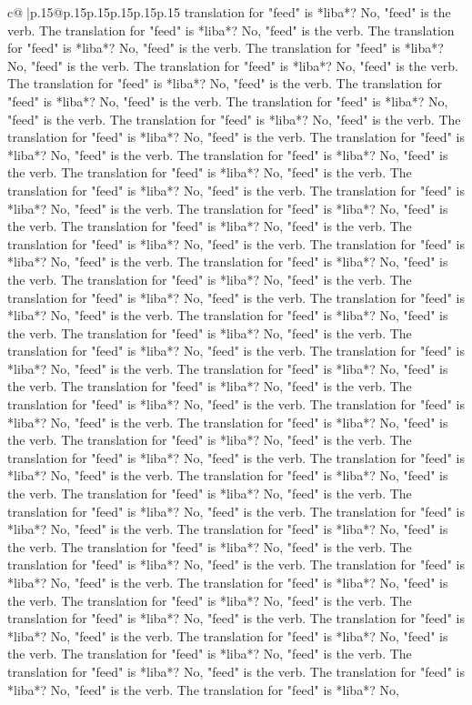 \documentclass{article}
\begin{document}
{\begin{supertabular}{c@{$\;$}|p{.15\linewidth}@{}p{.15\linewidth}p{.15\linewidth}p{.15\linewidth}p{.15\linewidth}p{.15\linewidth}}
{{{translation for "feed" is *liba*? No, "feed" is the verb. The translation for "feed" is *liba*? No, "feed" is the verb. The translation for "feed" is *liba*? No, "feed" is the verb. The translation for "feed" is *liba*? No, "feed" is the verb. The translation for "feed" is *liba*? No, "feed" is the verb. The translation for "feed" is *liba*? No, "feed" is the verb. The translation for "feed" is *liba*? No, "feed" is the verb. The translation for "feed" is *liba*? No, "feed" is the verb. The translation for "feed" is *liba*? No, "feed" is the verb. The translation for "feed" is *liba*? No, "feed" is the verb. The translation for "feed" is *liba*? No, "feed" is the verb. The translation for "feed" is *liba*? No, "feed" is the verb. The translation for "feed" is *liba*? No, "feed" is the verb. The translation for "feed" is *liba*? No, "feed" is the verb. The translation for "feed" is *liba*? No, "feed" is the verb. The translation for "feed" is *liba*? No, "feed" is the verb. The translation for "feed" is *liba*? No, "feed" is the verb. The translation for "feed" is *liba*? No, "feed" is the verb. The translation for "feed" is *liba*? No, "feed" is the verb. The translation for "feed" is *liba*? No, "feed" is the verb. The translation for "feed" is *liba*? No, "feed" is the verb. The translation for "feed" is *liba*? No, "feed" is the verb. The translation for "feed" is *liba*? No, "feed" is the verb. The translation for "feed" is *liba*? No, "feed" is the verb. The translation for "feed" is *liba*? No, "feed" is the verb. The translation for "feed" is *liba*? No, "feed" is the verb. The translation for "feed" is *liba*? No, "feed" is the verb. The translation for "feed" is *liba*? No, "feed" is the verb. The translation for "feed" is *liba*? No, "feed" is the verb. The translation for "feed" is *liba*? No, "feed" is the verb. The translation for "feed" is *liba*? No, "feed" is the verb. The translation for "feed" is *liba*? No, "feed" is the verb. The translation for "feed" is *liba*? No, "feed" is the verb. The translation for "feed" is *liba*? No, "feed" is the verb. The translation for "feed" is *liba*? No, "feed" is the verb. The translation for "feed" is *liba*? No, "feed" is the verb. The translation for "feed" is *liba*? No, "feed" is the verb. The translation for "feed" is *liba*? No, "feed" is the verb. The translation for "feed" is *liba*? No, "feed" is the verb. The translation for "feed" is *liba*? No, "feed" is the verb. The translation for "feed" is *liba*? No, "feed" is the verb. The translation for "feed" is *liba*? No, "feed" is the verb. The translation for "feed" is *liba*? No, "feed" is the verb. The translation for "feed" is *liba*? No, "feed" is the verb. The translation for "feed" is *liba*? No, "feed" is the verb. The translation for "feed" is *liba*? No, "feed" is the verb. The translation for "feed" is *liba*? No, "feed" is the verb. The translation for "feed" is *liba*? No, "feed" is the verb. The translation for "feed" is *liba*? No, "feed" is the verb. The translation for "feed" is *liba*? No, "feed" is the verb. The translation for "feed" is *liba*? No, "feed" is the verb. The translation for "feed" is *liba*? No, }}}
\end{supertabular}}
\end{document}

